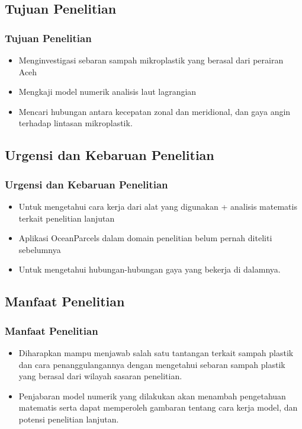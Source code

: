 \documentclass{beamer}
\begin{document}
\subsection{Tujuan Penelitian}
\begin{frame}
\frametitle{Tujuan Penelitian}
	\begin{itemize}
		\item Menginvestigasi sebaran sampah mikroplastik yang berasal dari perairan Aceh
		\item Mengkaji model numerik analisis laut lagrangian
		\item Mencari hubungan antara kecepatan zonal dan meridional, dan gaya angin terhadap lintasan mikroplastik.
	\end{itemize}
\end{frame}

\subsection{Urgensi dan Kebaruan Penelitian}
\begin{frame}
	\frametitle{Urgensi dan Kebaruan Penelitian}
	\begin{itemize}
		\item Untuk mengetahui cara kerja dari alat yang digunakan + analisis matematis terkait penelitian lanjutan
		\item Aplikasi OceanParcels dalam domain penelitian belum pernah diteliti sebelumnya
		\item Untuk mengetahui hubungan-hubungan gaya yang bekerja di dalamnya.
	\end{itemize}
\end{frame}

\subsection{Manfaat Penelitian}
\begin{frame}
	\frametitle{Manfaat Penelitian}
	\begin{itemize}
		\item Diharapkan mampu menjawab salah satu tantangan terkait sampah plastik dan cara penanggulangannya dengan mengetahui sebaran sampah plastik yang berasal dari wilayah sasaran penelitian.
		\item Penjabaran model numerik yang dilakukan akan menambah pengetahuan matematis serta dapat memperoleh gambaran tentang cara kerja model, dan potensi penelitian lanjutan.
	\end{itemize}
\end{frame}
\end{document}
